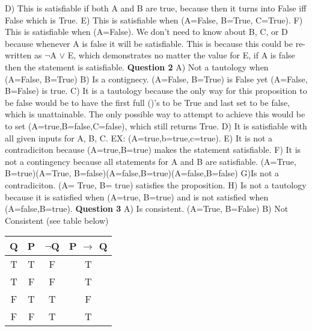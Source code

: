 \documentclass{article}
\begin{document}
D) This is satisfiable if both A and B are true, because then it turns into False iff False which is True.\newline
E) This is satisfiable when (A=False, B=True, C=True).\newline
F) This is satisfiable when (A=False). We don't need to know about B, C, or D because whenever A is false it will be satisfiable. This is because this could be re-written as $\neg$A $\lor$ E, which demonstrates no matter the value for E, if A is false then the statement is satisfiable.\newline
\newline
\textbf{Question 2}\newline
A) Not a tautology when (A=False, B=True)\newline
B) Is a contignecy. (A=False, B=True) is False yet (A=False, B=False) is true.\newline
C) It is a tautology because the only way for this proposition to be false would be to have the first full ()'s to be True and last set to be false, which is unattainable. The only possible way to attempt to achieve this would be to set (A=true,B=false,C=false), which still returns True. \newline
D) It is satisfiable with all given inputs for A, B, C. EX: (A=true,b=true,c=true). \newline
E) It is not a contradiciton because (A=true,B=true) makes the statement satisfiable.
F) It is not a contingency because all statements for A and B are satisfiable. (A=True, B=true)(A=True, B=false)(A=false,B=true)(A=false,B=false)\newline
G)Is not a contradiciton. (A= True, B= true) satisfies the proposition.\newline
H) Is not a tautology because it is satisfied when (A=true, B=true) and is not satisfied when (A=false,B=true). \newline
\newline
\textbf{Question 3}\newline
A) Is consistent. (A=True, B=False)\newline
B) Not Consistent (see table below)\newline
\begin{center}
\begin{tabular}{ |c|c|c|c| } 
 \hline
 Q & P & $\neg$Q & P $\rightarrow$ Q \\ 
\hline
 T & T & F & T\\
 T & F & F & T\\
 F & T & T & F\\
 F & F & T & T\\
 \hline
\end{tabular}
\end{center}
\end{document}
